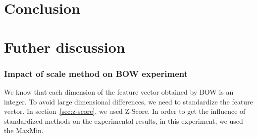 \documentclass[conference]{IEEEtran}
\begin{document}
\section{Conclusion}

\section{Futher discussion}
\subsubsection{Impact of scale method on BOW experiment}
We know that each dimension of the feature vector obtained by BOW is an integer. To avoid large dimensional differences, we need to standardize the feature vector. In section~\ref{sec:z-score}, we used Z-Score. In order to get the influence of standardized methods on the experimental results, in this experiment, we used the MaxMin.
\end{document}
